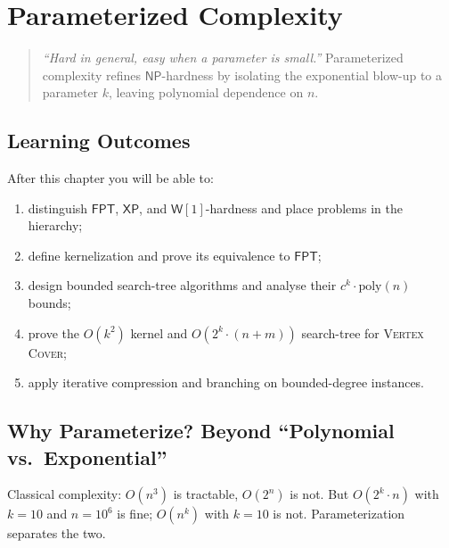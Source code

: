 \chapter{Parameterized Complexity}
\label{ch:param}

\begin{quote}
\emph{``Hard in general, easy when a parameter is small.''} Parameterized complexity refines $\mathsf{NP}$-hardness by isolating the exponential blow-up to a parameter $k$, leaving polynomial dependence on $n$.
\end{quote}

\noindent{}
\vspace{0.4em}

\section*{Learning Outcomes}
After this chapter you will be able to:
\begin{enumerate}[label=(L\arabic*)]
    \item distinguish $\mathsf{FPT}$, $\mathsf{XP}$, and $\mathsf{W}[1]$-hardness and place problems in the hierarchy;
    \item define kernelization and prove its equivalence to $\mathsf{FPT}$;
    \item design bounded search-tree algorithms and analyse their $c^k\cdot\text{poly}(n)$ bounds;
    \item prove the $O(k^2)$ kernel and $O(2^k\cdot(n+m))$ search-tree for \textsc{Vertex Cover};
    \item apply iterative compression and branching on bounded-degree instances.
\end{enumerate}

\section{Why Parameterize? Beyond ``Polynomial vs.\ Exponential''}
\label{sec:why-param}

Classical complexity: $O(n^3)$ is tractable, $O(2^n)$ is not. But $O(2^k\cdot n)$ with $k=10$ and $n=10^6$ is fine; $O(n^k)$ with $k=10$ is not. Parameterization separates the two.

